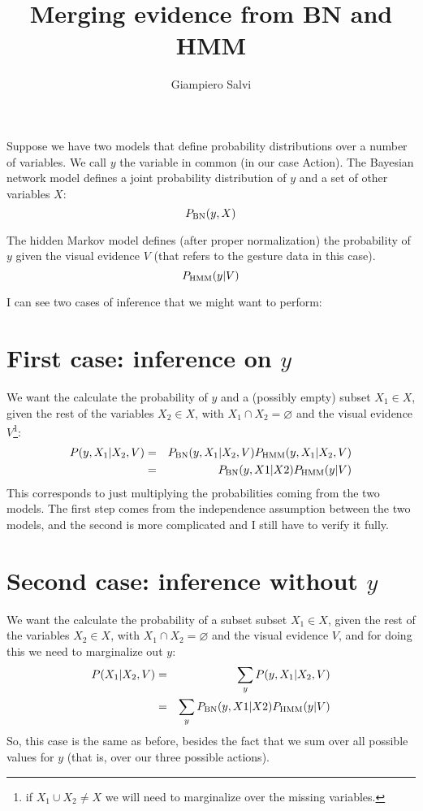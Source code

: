 \documentclass{article}
\title{Merging evidence from BN and HMM}
\author{Giampiero Salvi}
\begin{document}
\maketitle

\newcommand{\pbn}{\ensuremath P_{\scriptsize\mbox{BN}}}
\newcommand{\phmm}{\ensuremath P_{\scriptsize\mbox{HMM}}}

Suppose we have two models that define probability distributions over a number of variables.
We call $y$ the variable in common (in our case Action).
The Bayesian network model defines a joint probability distribution of $y$ and a set of other variables $X$:
\begin{equation}
\pbn(y,X)
\end{equation}

The hidden Markov model defines (after proper normalization) the probability of $y$ given the visual evidence $V$ (that refers to the gesture data in this case).
\begin{equation}
\phmm(y|V)
\end{equation}

I can see two cases of inference that we might want to perform:
\section{First case: inference on $y$}
We want the calculate the probability of $y$ and a (possibly empty) subset $X_1 \in X$, given the rest of the variables $X_2\in X$, with $X_1 \cap X_2 = \varnothing$ and the visual evidence $V$\footnote{if $X_1 \cup X_2 \neq X$ we will need to marginalize over the missing variables.}:
\begin{eqnarray}
P(y, X_1|X_2, V) &=& \pbn(y, X_1|X_2,V)\phmm(y,X_1|X_2,V) \\
&=& \pbn(y,X1|X2)\phmm(y|V) \label{bn-hmm1}
\end{eqnarray}
This corresponds to just multiplying the probabilities coming from the two models.
The first step comes from the independence assumption between the two models, and the second is more complicated and I still have to verify it fully.

\section{Second case: inference without $y$}
We want the calculate the probability of a subset subset $X_1 \in X$, given the rest of the variables $X_2\in X$, with $X_1 \cap X_2 = \varnothing$ and the visual evidence $V$, and for doing this we need to marginalize out $y$:
\begin{eqnarray}
P(X_1|X_2, V) &=& \sum_y P(y, X_1|X_2, V) \\
&=& \sum_y \pbn(y,X1|X2)\phmm(y|V) \label{bn-hmm2}
\end{eqnarray}
So, this case is the same as before, besides the fact that we sum over all possible values for $y$ (that is, over our three possible actions).
\end{document}
